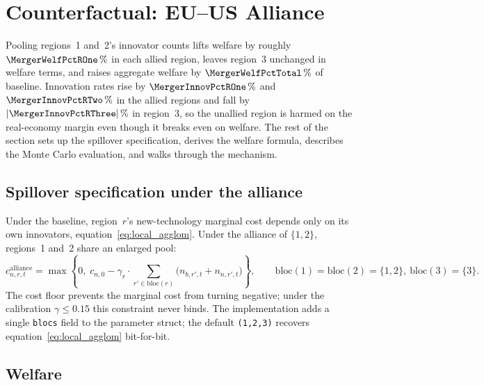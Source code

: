 \documentclass[12pt]{article}
\begin{document}
\appendix

\section{Counterfactual: EU--US Alliance}
\label{sec:merger}

Pooling regions~1 and~2's innovator counts lifts welfare by roughly
$\MergerWelfPctROne\,\%$ in each allied region, leaves region~3 unchanged
in welfare terms, and raises aggregate welfare by $\MergerWelfPctTotal\,\%$
of baseline. Innovation rates rise by $\MergerInnovPctROne\,\%$ and
$\MergerInnovPctRTwo\,\%$ in the allied regions and fall by
$|\MergerInnovPctRThree|\,\%$ in region~3, so the unallied region is harmed
on the real-economy margin even though it breaks even on welfare. The rest
of the section sets up the spillover specification, derives the welfare
formula, describes the Monte Carlo evaluation, and walks through the
mechanism.

\subsection{Spillover specification under the alliance}

Under the baseline, region~$r$'s new-technology marginal cost depends only
on its own innovators, equation~\eqref{eq:local_agglom}. Under the alliance
of $\{1, 2\}$, regions~1 and~2 share an enlarged pool:
\begin{equation}
  c_{n,r,t}^{\mathrm{alliance}}
    = \max\!\left\{0,\; c_{n,0} - \gamma_r \cdot \!\sum_{r' \in \mathrm{bloc}(r)}\!
      \bigl(n_{b,r',t} + n_{n,r',t}\bigr)\right\},
  \qquad
  \mathrm{bloc}(1) = \mathrm{bloc}(2) = \{1, 2\},\
  \mathrm{bloc}(3) = \{3\}.
  \label{eq:bloc_pool}
\end{equation}
The cost floor prevents the marginal cost from turning negative; under the
calibration $\gamma \le 0.15$ this constraint never binds. The implementation
adds a single \texttt{blocs} field to the parameter struct; the default
\texttt{(1,2,3)} recovers equation~\eqref{eq:local_agglom} bit-for-bit.

\subsection{Welfare}
\end{document}
